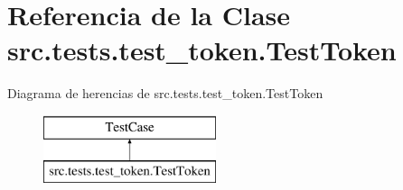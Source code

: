 \hypertarget{classsrc_1_1tests_1_1test__token_1_1_test_token}{\section{Referencia de la Clase src.\-tests.\-test\-\_\-token.\-Test\-Token}
\label{classsrc_1_1tests_1_1test__token_1_1_test_token}
}
Diagrama de herencias de src.\-tests.\-test\-\_\-token.\-Test\-Token\begin{figure}[H]
\begin{center}
\leavevmode
\includegraphics[height=2.000000cm]{classsrc_1_1tests_1_1test__token_1_1_test_token}
\end{center}
\end{figure}
